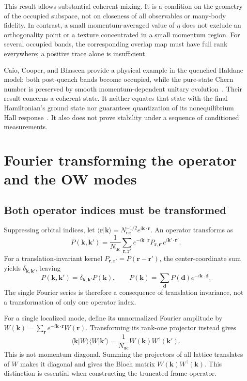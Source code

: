 \documentclass[aps,prb,onecolumn,nofootinbib,superscriptaddress]{revtex4-2}
\newcommand{\bk}{\boldsymbol k}
\newcommand{\br}{\boldsymbol r}
\begin{document}
This result allows substantial coherent mixing. It is a condition on the geometry of the occupied subspace, not on closeness of all observables or many-body fidelity. In contrast, a small momentum-averaged value of $\eta$ does not exclude an orthogonality point or a texture concentrated in a small momentum region. For several occupied bands, the corresponding overlap map must have full rank everywhere; a positive trace alone is insufficient.

Caio, Cooper, and Bhaseen provide a physical example in the quenched Haldane model: both post-quench bands become occupied, while the pure-state Chern number is preserved by smooth momentum-dependent unitary evolution~\cite{Caio2015}. Their result concerns a coherent state. It neither equates that state with the final Hamiltonian's ground state nor guarantees quantization of its nonequilibrium Hall response~\cite{Caio2016}. It also does not prove stability under a sequence of conditioned measurements.

\section{Fourier transforming the operator and the OW modes}

\subsection{Both operator indices must be transformed}

Suppressing orbital indices, let $\langle\br|\bk\rangle=N_{\mathrm{uc}}^{-1/2}e^{i\bk\cdot\br}$. An operator transforms as
\begin{equation}
 P(\bk,\bk')=\frac{1}{N_{\mathrm{uc}}}
 \sum_{\br,\br'}e^{-i\bk\cdot\br}P_{\br,\br'}e^{i\bk'\cdot\br'}.
 \label{eq:double-fourier}
\end{equation}
For a translation-invariant kernel $P_{\br,\br'}=P(\br-\br')$, the center-coordinate sum yields $\delta_{\bk,\bk'}$, leaving
\begin{equation}
 P(\bk,\bk')=\delta_{\bk,\bk'}P(\bk),\qquad
 P(\bk)=\sum_{\boldsymbol d}P(\boldsymbol d)e^{-i\bk\cdot\boldsymbol d}.
 \label{eq:relative-fourier}
\end{equation}
The single Fourier series is therefore a consequence of translation invariance, not a transformation of only one operator index.

For a single localized mode, define its unnormalized Fourier amplitude by $W(\bk)=\sum_{\br}e^{-i\bk\cdot\br}W(\br)$. Transforming its rank-one projector instead gives
\begin{equation}
 \langle\bk|W\rangle\langle W|\bk'\rangle
 =\frac{1}{N_{\mathrm{uc}}}W(\bk)W^\dagger(\bk').
 \label{eq:mode-fourier}
\end{equation}
This is not momentum diagonal. Summing the projectors of all lattice translates of $W$ makes it diagonal and gives the Bloch matrix $W(\bk)W^\dagger(\bk)$. This distinction is essential when constructing the truncated frame operator.
\end{document}
